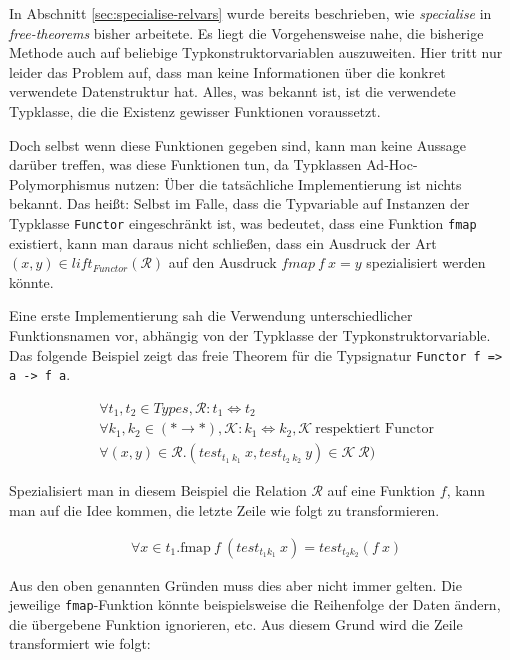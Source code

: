 In Abschnitt \ref{sec:specialise-relvars} wurde bereits beschrieben, wie \textit{specialise} in \textit{free-theorems} bisher arbeitete.
Es liegt die Vorgehensweise nahe, die bisherige Methode auch auf beliebige Typkonstruktorvariablen auszuweiten. Hier tritt nur leider
das Problem auf, dass man keine Informationen über die konkret verwendete Datenstruktur hat. Alles, was bekannt ist, ist die
verwendete Typklasse, die die Existenz gewisser Funktionen voraussetzt.

Doch selbst wenn diese Funktionen gegeben sind, kann man keine Aussage darüber treffen, was diese Funktionen tun, da
Typklassen Ad-Hoc-Polymorphismus nutzen: Über die tatsächliche Implementierung ist nichts bekannt. Das heißt: Selbst im Falle, dass
die Typvariable auf Instanzen der Typklasse \texttt{Functor} eingeschränkt ist, was bedeutet, dass eine Funktion \texttt{fmap}
existiert, kann man daraus nicht schließen, dass ein Ausdruck der Art $(x, y) \in lift_{Functor}(\mathcal{R})$ auf den Ausdruck
$fmap\ f\ x = y$ spezialisiert werden könnte.

Eine erste Implementierung sah die Verwendung unterschiedlicher Funktionsnamen vor, abhängig von der Typklasse der
Typkonstruktorvariable. Das folgende Beispiel zeigt das freie Theorem für die Typsignatur \texttt{Functor f => a -> f a}.

\begin{align*}
& \forall t_1, t_2 \in Types, \mathcal{R} : t_1 \Leftrightarrow t_2 \\
& \forall k_1, k_2 \in (* \rightarrow *), \mathcal{K} : k_1 \Leftrightarrow k_2, \mathcal{K}\ \text{respektiert Functor} \\
& \forall (x, y) \in \mathcal{R} . (test_{t_1\ k_1}\ x, test_{t_2\ k_2}\ y) \in \mathcal{K}\ \mathcal{R})
\end{align*}

Spezialisiert man in diesem Beispiel die Relation $\mathcal{R}$ auf eine Funktion $f$, kann man auf die Idee kommen, die letzte
Zeile wie folgt zu transformieren.

\begin{align*}
& \forall x \in t_1 . \text{fmap}\ f\ (test_{t_1 k_1}\ x) = test_{t_2 k_2} (f\ x)
\end{align*}

Aus den oben genannten Gründen muss dies aber nicht immer gelten. Die jeweilige \texttt{fmap}-Funktion könnte beispielsweise
die Reihenfolge der Daten ändern, die übergebene Funktion ignorieren, etc.
Aus diesem Grund wird die Zeile transformiert wie folgt:

